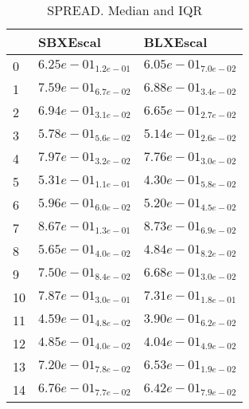\documentclass{article}
\begin{document}
\begin{table}
\caption{SPREAD. Median and IQR}
\label{table:median.SPREAD}
\begin{scriptsize}
\centering
\begin{tabular}{lll}
\hline & SBXEscal &  BLXEscal\\
\hline
0 & \cellcolor{gray25}$  6.25e-01_{ 1.2e-01}$ & \cellcolor{gray95}$  6.05e-01_{ 7.0e-02}$ \\
1 & \cellcolor{gray25}$  7.59e-01_{ 6.7e-02}$ & \cellcolor{gray95}$  6.88e-01_{ 3.4e-02}$ \\
2 & \cellcolor{gray25}$  6.94e-01_{ 3.1e-02}$ & \cellcolor{gray95}$  6.65e-01_{ 2.7e-02}$ \\
3 & \cellcolor{gray25}$  5.78e-01_{ 5.6e-02}$ & \cellcolor{gray95}$  5.14e-01_{ 2.6e-02}$ \\
4 & \cellcolor{gray25}$  7.97e-01_{ 3.2e-02}$ & \cellcolor{gray95}$  7.76e-01_{ 3.0e-02}$ \\
5 & \cellcolor{gray25}$  5.31e-01_{ 1.1e-01}$ & \cellcolor{gray95}$  4.30e-01_{ 5.8e-02}$ \\
6 & \cellcolor{gray25}$  5.96e-01_{ 6.0e-02}$ & \cellcolor{gray95}$  5.20e-01_{ 4.5e-02}$ \\
7 & \cellcolor{gray95}$  8.67e-01_{ 1.3e-01}$ & $  8.73e-01_{ 6.9e-02}$ \\
8 & \cellcolor{gray25}$  5.65e-01_{ 4.0e-02}$ & \cellcolor{gray95}$  4.84e-01_{ 8.2e-02}$ \\
9 & \cellcolor{gray25}$  7.50e-01_{ 8.4e-02}$ & \cellcolor{gray95}$  6.68e-01_{ 3.0e-02}$ \\
10 & \cellcolor{gray25}$  7.87e-01_{ 3.0e-01}$ & \cellcolor{gray95}$  7.31e-01_{ 1.8e-01}$ \\
11 & \cellcolor{gray25}$  4.59e-01_{ 4.8e-02}$ & \cellcolor{gray95}$  3.90e-01_{ 6.2e-02}$ \\
12 & \cellcolor{gray25}$  4.85e-01_{ 4.0e-02}$ & \cellcolor{gray95}$  4.04e-01_{ 4.9e-02}$ \\
13 & \cellcolor{gray25}$  7.20e-01_{ 7.8e-02}$ & \cellcolor{gray95}$  6.53e-01_{ 1.9e-02}$ \\
14 & \cellcolor{gray25}$  6.76e-01_{ 7.7e-02}$ & \cellcolor{gray95}$  6.42e-01_{ 7.9e-02}$ \\
\hline
\end{tabular}
\end{scriptsize}
\end{table}
\
\end{document}
